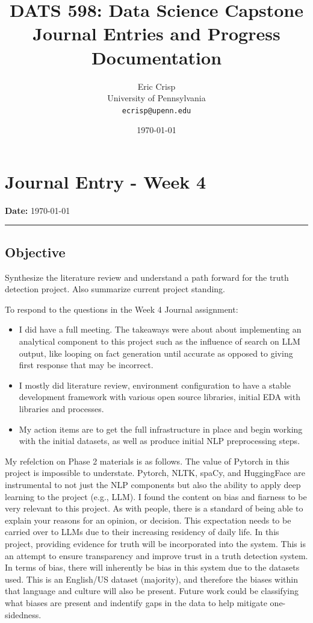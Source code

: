 \documentclass[11pt,letterpaper]{article}
\title{\Large \textbf{DATS 598: Data Science Capstone} \\ 
       \large Journal Entries and Progress Documentation \\
       \vspace{0.5cm}
       \normalsize \textbf{\workingtitle}}
\author{Eric Crisp \\ 
        University of Pennsylvania \\
        \texttt{ecrisp@upenn.edu}}
\date{\today}
\newcommand{\journalentry}[2]{
    \section*{Journal Entry - #1}
    \addcontentsline{toc}{section}{Journal Entry - #1}
    \textbf{Date:} #2 \\
    \rule{\textwidth}{0.5pt}
}
\newcommand{\objective}[1]{
    \subsection*{Objective}
    #1
}
\begin{document}
\maketitle
\tableofcontents
\newpage


\journalentry{Week 4}{\today}

\objective{
Synthesize the literature review and understand a path forward for the truth detection project. Also summarize current project standing.

To respond to the questions in the Week 4 Journal assignment:

\begin{itemize}
    \item I did have a full meeting. The takeaways were about about implementing an analytical component to this project such as the influence of search on LLM output, like looping on fact generation until accurate as opposed to giving first response that may be incorrect. 
    \item I mostly did literature review, environment configuration to have a stable development framework with various open source libraries, initial EDA with libraries and processes.
    \item My action items are to get the full infrastructure in place and begin working with the initial datasets, as well as produce initial NLP preprocessing steps.
\end{itemize}

My refelction on Phase 2 materials is as follows. The value of Pytorch in this project is impossible to understate. Pytorch, NLTK, spaCy, and HuggingFace are instrumental to not just the NLP components but also the ability to apply deep learning to the project (e.g., LLM). I found the content on bias and fiarness to be very relevant to this project. As with people, there is a standard of being able to explain your reasons for an opinion, or decision. This expectation needs to be carried over to LLMs due to their increasing residency of daily life. In this project, providing evidence for truth will be incorporated into the system. This is an attempt to ensure transparency and improve trust in a truth detection system. In terms of bias, there will inherently be bias in this system due to the datasets used. This is an English/US dataset (majority), and therefore the biases within that language and culture will also be present. Future work could be  classifying what biases are present and indentify gaps in the data to help mitigate one-sidedness.
}
\end{document}
